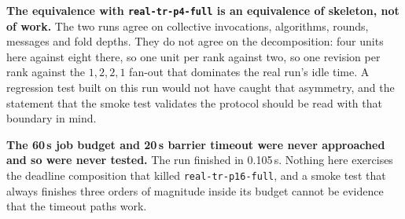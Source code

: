 \documentclass[11pt]{article}
\begin{document}
\textbf{The equivalence with \texttt{real-tr-p4-full} is an equivalence of skeleton, not of
work.} The two runs agree on collective invocations, algorithms, rounds, messages and fold depths.
They do not agree on the decomposition: four units here against eight there, so one unit per rank
against two, so one revision per rank against the $1,2,2,1$ fan-out that dominates the real run's
idle time. A regression test built on this run would not have caught that asymmetry, and the
statement that the smoke test validates the protocol should be read with that boundary in mind.

\textbf{The 60\,s job budget and 20\,s barrier timeout were never approached and so were never
tested.} The run finished in 0.105\,s. Nothing here exercises the deadline composition that killed
\texttt{real-tr-p16-full}, and a smoke test that always finishes three orders of magnitude inside
its budget cannot be evidence that the timeout paths work.
\end{document}
